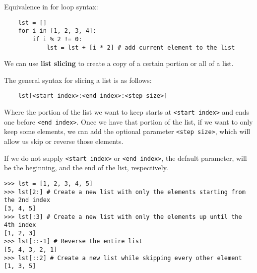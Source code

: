 Equivalence in for loop syntax:

\begin{lstlisting}
	lst = []
	for i in [1, 2, 3, 4]:
		if i % 2 != 0:
			lst = lst + [i * 2] # add current element to the list
\end{lstlisting}

We can use \textbf{list slicing} to create a copy of a certain portion or all of a list.

The general syntax for slicing a list  is as follows:

\begin{lstlisting}
	lst[<start index>:<end index>:<step size>]
\end{lstlisting}

Where the portion of the list we want to keep starts at \lstinline{<start index>} and ends one before
\lstinline{<end index>}. Once we have that portion of the list, if we want to only keep some elements, we can
add the optional parameter \lstinline{<step size>}, which will allow us skip or reverse those elements.

If we do not supply \lstinline{<start index>} or \lstinline{<end index>}, the default parameter, will be the
beginning, and the end of the list, respectively. 

\begin{lstlisting}
>>> lst = [1, 2, 3, 4, 5]
>>> lst[2:] # Create a new list with only the elements starting from the 2nd index
[3, 4, 5]
>>> lst[:3] # Create a new list with only the elements up until the 4th index
[1, 2, 3]
>>> lst[::-1] # Reverse the entire list
[5, 4, 3, 2, 1]
>>> lst[::2] # Create a new list while skipping every other element
[1, 3, 5]
\end{lstlisting}

